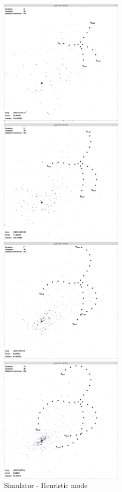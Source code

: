 \documentclass[10pt,a4paper]{book}
\begin{document}
\begin{figure}[H]
\centering
\begin{minipage}{60mm}
  \centering
	\includegraphics[width=60mm]{heuristics2.png}
	
\end{minipage}%
\begin{minipage}{60mm}
  \centering
	\includegraphics[width=60mm]{heuristics3.png}
\end{minipage}
\begin{minipage}{60mm}
  \centering
	\includegraphics[width=60mm]{heuristics4.png}
\end{minipage}%
\begin{minipage}{60mm}
  \centering
	\includegraphics[width=60mm]{heuristics5.png}
\end{minipage}
\caption{Simulator - Heuristic mode}
\label{simulator_heuristics}
\end{figure}
\end{document}
